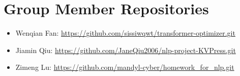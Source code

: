 \documentclass{article}
\begin{document}
  \section{Group Member Repositories}

  \begin{itemize}
    \item Wenqian Fan: \url{https://github.com/sissiwqwt/transformer-optimizer.git}
    \item Jiamin Qiu: \url{https://github.com/JaneQiu2006/nlp-project-KVPress.git}
    \item Zimeng Lu: \url{https://github.com/mandyl-cyber/homework_for_nlp.git}
  \end{itemize}
\end{document}

